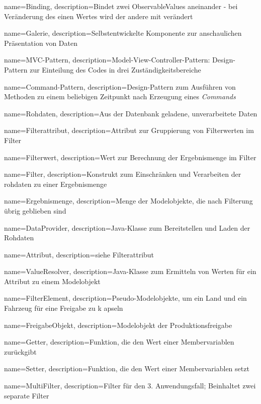 
 {
	name=Binding,
	description={Bindet zwei ObservableValues aneinander - bei Veränderung des einen Wertes wird der andere mit verändert}
}

 {
	name=Galerie,
	description={Selbstentwickelte Komponente zur anschaulichen Präsentation von Daten}
}

 {
	name=MVC-Pattern,
	description={Model-View-Controller-Pattern: Design-Pattern zur Einteilung des Codes in drei Zuständigkeitsbereiche}
}

 {
	name=Command-Pattern,
	description={Design-Pattern zum Ausführen von Methoden zu einem beliebigen Zeitpunkt nach Erzeugung eines \textit{Commands}}
}

 {
	name=Rohdaten,
	description={Aus der Datenbank geladene, unverarbeitete Daten}
}

 {
	name=Filterattribut,
	description={Attribut zur Gruppierung von Filterwerten im Filter}
}

 {
	name=Filterwert,
	description={Wert zur Berechnung der Ergebnismenge im Filter}
}

 {
	name=Filter,
	description={Konstrukt zum Einschränken und Verarbeiten der rohdaten zu einer Ergebnismenge}
}

 {
	name=Ergebnismenge,
	description={Menge der Modelobjekte, die nach Filterung übrig geblieben sind}
}

 {
	name=DataProvider,
	description={Java-Klasse zum Bereitstellen und Laden der Rohdaten}
}

 {
	name=Attribut,
	description={siehe Filterattribut}
}

 {
	name=ValueResolver,
	description={Java-Klasse zum Ermitteln von Werten für ein Attribut zu einem Modelobjekt}
}

 {
	name=FilterElement,
	description={Pseudo-Modelobjekte, um ein Land und ein Fahrzeug für eine Freigabe zu k apseln}
}

 {
	name=FreigabeObjekt,
	description={Modelobjekt der Produktionsfreigabe}
}

 {
	name=Getter,
	description={Funktion, die den Wert einer Membervariablen zurückgibt}
}

 {
	name=Setter,
	description={Funktion, die den Wert einer Membervariablen setzt}
}

 {
	name=MultiFilter,
	description={Filter für den 3. Anwendungsfall; Beinhaltet zwei separate Filter}
}